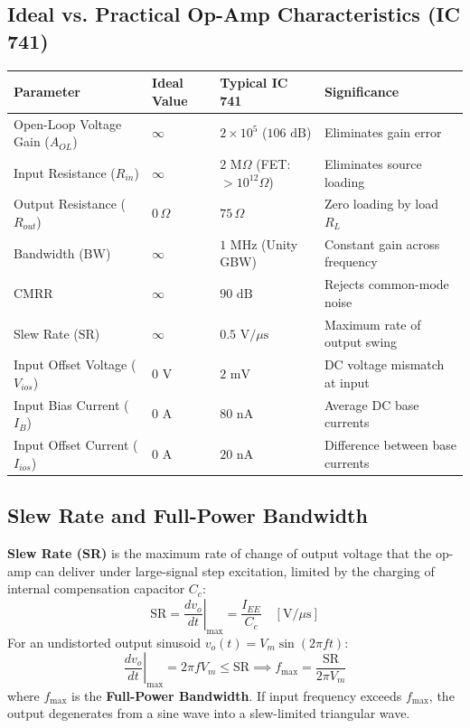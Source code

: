 \documentclass[12pt,a4paper]{article}
\begin{document}
\subsection{Ideal vs. Practical Op-Amp Characteristics (IC 741)}
\par\vspace{6pt}\noindent
\begin{tabularx}{\linewidth}{|B{3.4cm}|Y|Y|B{3.2cm}|}
\hline
\textbf{Parameter} & \textbf{Ideal Value} & \textbf{Typical IC 741} & \textbf{Significance} \\
\hline
Open-Loop Voltage Gain ($A_{OL}$) & $\infty$ & $2 \times 10^5$ ($106\text{ dB}$) & Eliminates gain error \\
Input Resistance ($R_{in}$) & $\infty$ & $2\text{ M}\Omega$ (FET: $> 10^{12}\Omega$) & Eliminates source loading \\
Output Resistance ($R_{out}$) & $0\,\Omega$ & $75\,\Omega$ & Zero loading by load $R_L$ \\
Bandwidth ($\text{BW}$) & $\infty$ & $1\text{ MHz}$ (Unity GBW) & Constant gain across frequency \\
CMRR & $\infty$ & $90\text{ dB}$ & Rejects common-mode noise \\
Slew Rate ($\text{SR}$) & $\infty$ & $0.5\text{ V}/\mu\text{s}$ & Maximum rate of output swing \\
Input Offset Voltage ($V_{ios}$) & $0\text{ V}$ & $2\text{ mV}$ & DC voltage mismatch at input \\
Input Bias Current ($I_B$) & $0\text{ A}$ & $80\text{ nA}$ & Average DC base currents \\
Input Offset Current ($I_{ios}$) & $0\text{ A}$ & $20\text{ nA}$ & Difference between base currents \\
\hline
\end{tabularx}
\vspace{12pt}

\subsection{Slew Rate and Full-Power Bandwidth}
\begin{tcolorbox}[formulabox, title={Slew Rate and Maximum Frequency Formulation}]
\textbf{Slew Rate (SR)} is the maximum rate of change of output voltage that the op-amp can deliver under large-signal step excitation, limited by the charging of internal compensation capacitor $C_c$:
\begin{equation}
  \text{SR} = \left.\frac{dv_o}{dt}\right|_{\max} = \frac{I_{EE}}{C_c} \quad [\text{V}/\mu\text{s}]
\end{equation}
For an undistorted output sinusoid $v_o(t) = V_m \sin(2\pi f t)$:
\begin{equation}
  \left.\frac{dv_o}{dt}\right|_{\max} = 2\pi f V_m \le \text{SR} \implies f_{\max} = \frac{\text{SR}}{2\pi V_m}
\end{equation}
where $f_{\max}$ is the \textbf{Full-Power Bandwidth}. If input frequency exceeds $f_{\max}$, the output degenerates from a sine wave into a slew-limited triangular wave.
\end{tcolorbox}
\end{document}

